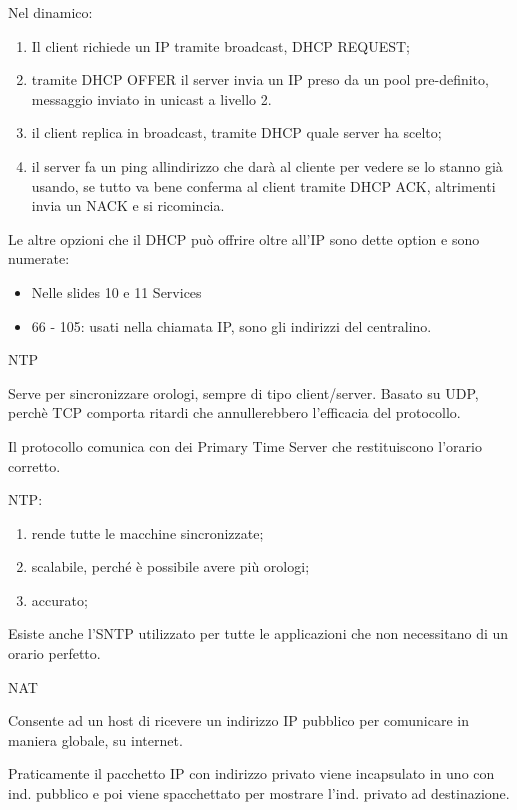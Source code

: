 Nel dinamico:

\begin{enumerate}
\def\labelenumi{\arabic{enumi}.}
\item
  Il client richiede un IP tramite broadcast, DHCP REQUEST;
\item
  tramite DHCP OFFER il server invia un IP preso da un pool
  pre-definito, messaggio inviato in unicast a livello 2.
\item
  il client replica in broadcast, tramite DHCP quale server ha scelto;
\item
  il server fa un ping all\textquotesingle indirizzo che darà al cliente
  per vedere se lo stanno già usando, se tutto va bene conferma al
  client tramite DHCP ACK, altrimenti invia un NACK e si ricomincia.
\end{enumerate}

Le altre opzioni che il DHCP può offrire oltre all'IP sono dette option
e sono numerate:

\begin{itemize}
\item
  Nelle slides 10 e 11 Services
\item
  66 - 105: usati nella chiamata IP, sono gli indirizzi del centralino.
\end{itemize}

NTP

Serve per sincronizzare orologi, sempre di tipo client/server. Basato su
UDP, perchè TCP comporta ritardi che annullerebbero l'efficacia del
protocollo.

Il protocollo comunica con dei Primary Time Server che restituiscono
l'orario corretto.

NTP:

\begin{enumerate}
\def\labelenumi{\arabic{enumi}.}
\item
  rende tutte le macchine sincronizzate;
\item
  scalabile, perché è possibile avere più orologi;
\item
  accurato;
\end{enumerate}

Esiste anche l'SNTP utilizzato per tutte le applicazioni che non
necessitano di un orario perfetto.

NAT

Consente ad un host di ricevere un indirizzo IP pubblico per comunicare
in maniera globale, su internet.

Praticamente il pacchetto IP con indirizzo privato viene incapsulato in
uno con ind. pubblico e poi viene spacchettato per mostrare l'ind.
privato ad destinazione.

